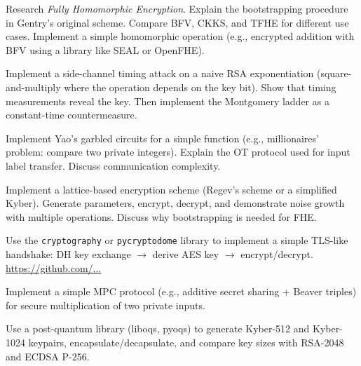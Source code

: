 \begin{exercise}[Challenge]
Research \emph{Fully Homomorphic Encryption}. Explain the bootstrapping procedure in Gentry's original scheme. Compare BFV, CKKS, and TFHE for different use cases. Implement a simple homomorphic operation (e.g., encrypted addition with BFV using a library like SEAL or OpenFHE).
\end{exercise}

\begin{exercise}[Challenge]
Implement a side-channel timing attack on a naive RSA exponentiation (square-and-multiply where the operation depends on the key bit). Show that timing measurements reveal the key. Then implement the Montgomery ladder as a constant-time countermeasure.
\end{exercise}

\begin{exercise}[Challenge]
Implement Yao's garbled circuits for a simple function (e.g., millionaires' problem: compare two private integers). Explain the OT protocol used for input label transfer. Discuss communication complexity.
\end{exercise}

\begin{exercise}[Challenge]
Implement a lattice-based encryption scheme (Regev's scheme or a simplified Kyber). Generate parameters, encrypt, decrypt, and demonstrate noise growth with multiple operations. Discuss why bootstrapping is needed for FHE.
\end{exercise}

\begin{exercise}[Computational]
Use the \texttt{cryptography} or \texttt{pycryptodome} library to implement a simple TLS-like handshake: DH key exchange $\to$ derive AES key $\to$ encrypt/decrypt. \url{https://github.com/...}
\end{exercise}

\begin{exercise}[Computational]
Implement a simple MPC protocol (e.g., additive secret sharing + Beaver triples) for secure multiplication of two private inputs.
\end{exercise}

\begin{exercise}[Computational]
Use a post-quantum library (liboqs, pyoqs) to generate Kyber-512 and Kyber-1024 keypairs, encapsulate/decapsulate, and compare key sizes with RSA-2048 and ECDSA P-256.
\end{exercise}

